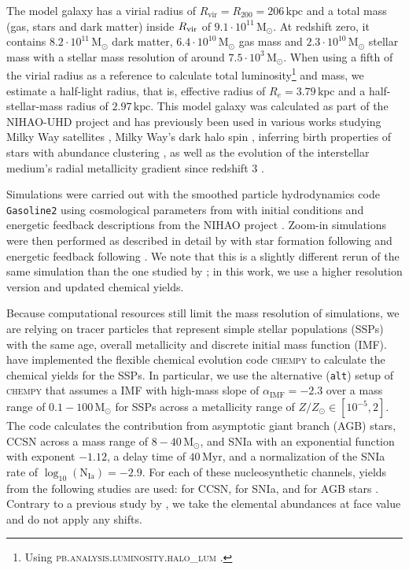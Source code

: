 \documentclass[twocolumn,apj,numberedappendix,appendixfloats]{openjournal}
\begin{document}
\begin{CJK*}{UTF8}{gbsn}
The model galaxy has a virial radius of $R_\mathrm{vir} = R_{200}=206\,\mathrm{kpc}$ and a total mass (gas, stars and dark matter) inside $R_{\rm vir}$ of $9.1 \cdot 10^{11}\,\mathrm{M_\odot}$. At redshift zero, it contains $8.2 \cdot 10^{11}\,\mathrm{M_\odot}$ dark matter, $6.4 \cdot 10^{10}\,\mathrm{M_\odot}$ gas mass and $2.3 \cdot 10^{10}\,\mathrm{M_\odot}$ stellar mass with a stellar mass resolution of around $7.5 \cdot 10^{3}\,\mathrm{M_\odot}$. When using a fifth of the virial radius as a reference to calculate total luminosity\footnote{Using \textsc{pb.analysis.luminosity.halo\_lum} \citep{pynbody}.} and mass, we estimate a half-light radius, that is, effective radius of $R_e = 3.79\,\mathrm{kpc}$ and a half-stellar-mass radius of $\mathrm{2.97\,\mathrm{kpc}}$. This model galaxy was calculated as part of the NIHAO-UHD project \citep{Buck2020b} and has previously been used in various works studying Milky Way satellites \citep{Buck2019b}, Milky Way's dark halo spin \citep{Obreja2022}, inferring birth properties of stars with abundance clustering \citep{Ratcliffe2022}, as well as the evolution of the interstellar medium's radial metallicity gradient since redshift 3 \citep{Ratcliffe2024b}.

Simulations were carried out with the smoothed particle hydrodynamics code \texttt{Gasoline2} \citep{Wadsley2017} using cosmological parameters from \citet{Planck2014} with initial conditions and energetic feedback descriptions from the NIHAO project \citep{Wang2015}. Zoom-in simulations were then performed as described in detail by \citet{Buck2021} with star formation following \citet{Stinson2006} and energetic feedback following \citet{Stinson2013}. We note that this is a slightly different rerun of the same simulation than the one studied by \citet{Buder2024}; in this work, we use a higher resolution version and updated chemical yields.

Because computational resources still limit the mass resolution of simulations, we are relying on tracer particles that represent simple stellar populations (SSPs) with the same age, overall metallicity and discrete initial mass function (IMF). \citet{Buck2021} have implemented the flexible chemical evolution code \textsc{chempy} \citep{Rybizki2017} to calculate the chemical yields for the SSPs. In particular, we use the alternative (\texttt{alt}) setup of \textsc{chempy} that assumes a \citet{Chabrier2003} IMF with high-mass slope of $\alpha_\text{IMF} = -2.3$ over a mass range of $0.1-100\,\mathrm{M_\odot}$ for SSPs across a metallicity range of $Z/Z_\odot \in [10^{-5},2]$. The code calculates the contribution from asymptotic giant branch (AGB) stars, CCSN across a mass range of $8-40\,\mathrm{M_\odot}$, and SNIa with an exponential function with exponent $-1.12$, a delay time of $40\,\mathrm{Myr}$, and a normalization of the SNIa rate of $\log_{10}(\mathrm{N_{Ia}}) = -2.9$. For each of these nucleosynthetic channels, yields from the following studies are used: \citet{Chieffi2004} for CCSN, \citet{Seitenzahl2013} for SNIa, and \citet{Karakas2016} for AGB stars \citep[\texttt{new\_fit} model in][]{Buck2021}. Contrary to a previous study by \citet{Buder2024}, we take the elemental abundances at face value and do not apply any shifts.


\end{CJK*}
\end{document}
